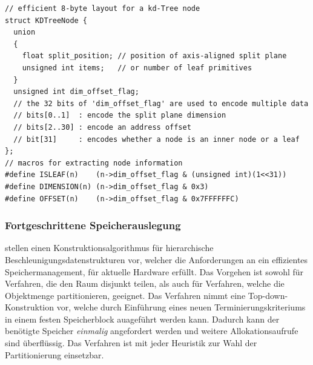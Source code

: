 \begin{lstlisting}[belowcaptionskip=8pt,float,mathescape=true,caption={[Kompakte Speicherauslegung eines kd-Tree Knotens]kd-tree Knoten in einem acht Byte Layout nach Benthin bzw Wald (ausgehend von 32-Bit Architektur). Verschiedene Attribute werden durch effiziente logische Anweisungen in einem unsigned int kombiniert},label=src:kdnode]
// efficient 8-byte layout for a kd-Tree node
struct KDTreeNode {
  union
  {
    float split_position; // position of axis-aligned split plane
    unsigned int items;   // or number of leaf primitives
  }
  unsigned int dim_offset_flag;
  // the 32 bits of 'dim_offset_flag' are used to encode multiple data
  // bits[0..1]  : encode the split plane dimension
  // bits[2..30] : encode an address offset
  // bit[31]     : encodes whether a node is an inner node or a leaf
};
// macros for extracting node information
#define ISLEAF(n)    (n->dim_offset_flag & (unsigned int)(1<<31))
#define DIMENSION(n) (n->dim_offset_flag & 0x3)
#define OFFSET(n)    (n->dim_offset_flag & 0x7FFFFFFC)
\end{lstlisting}

\subsubsection{Fortgeschrittene Speicherauslegung}
\label{sec:toxiememlayout}
\cite{WK07} stellen einen Konstruktionsalgorithmus für hierarchische Beschleunigungsdatenstrukturen vor, welcher die Anforderungen an ein effizientes Speichermanagement, für aktuelle Hardware erfüllt. Das Vorgehen ist sowohl für Verfahren, die den Raum disjunkt teilen, als auch für Verfahren, welche die Objektmenge partitionieren, geeignet.
Das Verfahren nimmt eine Top-down-Konstruktion vor, welche durch Einführung eines neuen Terminierungskriteriums in einem festen Speicherblock auageführt werden kann. Dadurch kann der benötigte Speicher \textit{einmalig} angefordert werden und weitere Allokationsaufrufe sind überflüssig. Das Verfahren ist mit jeder Heuristik zur Wahl der Partitionierung einsetzbar. 

